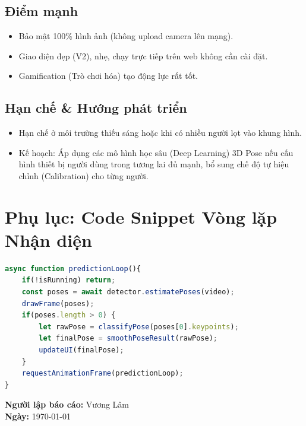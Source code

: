 \documentclass[12pt,a4paper]{article}
\begin{document}
\subsection{Điểm mạnh}
\begin{itemize}
    \item Bảo mật 100\% hình ảnh (không upload camera lên mạng).
    \item Giao diện đẹp (V2), nhẹ, chạy trực tiếp trên web không cần cài đặt.
    \item Gamification (Trò chơi hóa) tạo động lực rất tốt.
\end{itemize}

\subsection{Hạn chế \& Hướng phát triển}
\begin{itemize}
    \item Hạn chế ở môi trường thiếu sáng hoặc khi có nhiều người lọt vào khung hình.
    \item Kế hoạch: Áp dụng các mô hình học sâu (Deep Learning) 3D Pose nếu cấu hình thiết bị người dùng trong tương lai đủ mạnh, bổ sung chế độ tự hiệu chỉnh (Calibration) cho từng người.
\end{itemize}

\newpage
\appendix
\section{Phụ lục: Code Snippet Vòng lặp Nhận diện}
\begin{lstlisting}[language=JavaScript]
async function predictionLoop(){
    if(!isRunning) return;
    const poses = await detector.estimatePoses(video);
    drawFrame(poses);
    if(poses.length > 0) {
        let rawPose = classifyPose(poses[0].keypoints);
        let finalPose = smoothPoseResult(rawPose);
        updateUI(finalPose);
    }
    requestAnimationFrame(predictionLoop);
}
\end{lstlisting}

\vspace{1cm}
\noindent \textbf{Người lập báo cáo:} Vương Lâm \\
\noindent \textbf{Ngày:} \today
\end{document}
